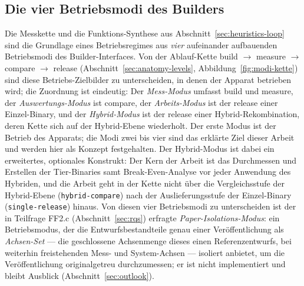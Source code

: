 \begin{nurlang}
\subsection{Die vier Betriebsmodi des Builders}\label{sec:heuristics-modes}
Die Messkette und die Funktions-Synthese aus Abschnitt~\ref{sec:heuristics-loop} sind die Grundlage
eines Betriebsregimes aus \emph{vier} aufeinander aufbauenden
Betriebsmodi des Builder-Interfaces. Von der Ablauf-Kette build $\to$ measure $\to$ compare $\to$ release
(Abschnitt~\ref{sec:anatomy-levels}, Abbildung~\ref{fig:modi-kette}) sind diese Betriebs-Zielbilder zu
unterscheiden, in denen der Apparat betrieben wird; die Zuordnung ist eindeutig: Der \emph{Mess-Modus}
umfasst build und measure, der \emph{Auswertungs-Modus} ist compare, der \emph{Arbeits-Modus} ist der
release einer Einzel-Binary, und der \emph{Hybrid-Modus} ist der release einer Hybrid-Rekombination,
deren Kette sich auf der Hybrid-Ebene wiederholt. Der erste Modus ist der Betrieb des Apparats; die Modi
zwei bis vier sind das erklärte Ziel dieser Arbeit und werden hier als Konzept festgehalten. Der
Hybrid-Modus ist dabei ein erweitertes, optionales Konstrukt: Der Kern der Arbeit ist das Durchmessen
und Erstellen der Tier-Binaries samt Break-Even-Analyse vor jeder Anwendung des Hybriden, und die Arbeit
geht in der Kette nicht über die Vergleichsstufe der Hybrid-Ebene (\texttt{hybrid-compare}) nach der
Auslieferungsstufe der Einzel-Binary (\texttt{single-release}) hinaus. Von diesen vier
Betriebsmodi zu unterscheiden ist der in Teilfrage FF2.c (Abschnitt~\ref{sec:rqs}) erfragte
\emph{Paper-Isolations-Modus}: ein Betriebsmodus, der die Entwurfsbestandteile genau einer
Veröffentlichung als \emph{Achsen-Set} --- die geschlossene Achsenmenge dieses einen Referenzentwurfs,
bei weiterhin freistehenden Mess- und System-Achsen --- isoliert anbietet, um die Veröffentlichung
originalgetreu durchzumessen; er ist nicht implementiert und bleibt Ausblick (Abschnitt~\ref{sec:outlook}).
\end{nurlang}
